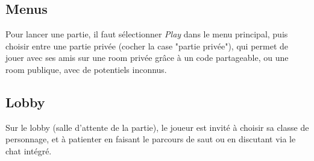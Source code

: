 \subsection{Menus}

    Pour lancer une partie, il faut sélectionner \textit{Play} dans le menu principal, puis choisir 
    entre une partie privée (cocher la case "partie privée"), qui permet de jouer avec ses amis sur une 
    room privée grâce à un code partageable, ou une room publique, avec de potentiels inconnus.

\subsection{Lobby}

    Sur le lobby (salle d'attente de la partie), le joueur est invité à choisir sa classe de personnage, et à 
    patienter en faisant le parcours de saut ou en discutant via le chat intégré.

    